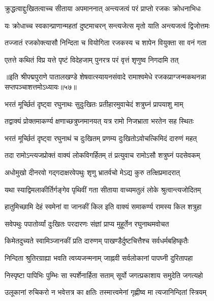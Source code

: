 \twolineshloka
{क्रुद्धत्वाद्दुःखितत्वाच्च सीताया अपमाननात्}
{अन्त्यजत्वं परं प्राप्तो रजकः क्रोधनाभिधः}%

\twolineshloka
{यः क्रोधाच्च स्वकान्प्राणान्महतां दुष्टमाचरन्}
{सन्त्यजेत्स मृतो याति अन्त्यजत्वं द्विजोत्तमः}%

\twolineshloka
{तज्जातं रजकोक्त्यासौ निन्दिता च वियोगिता}
{रजकस्य च शापेन वियुक्ता सा वनं गता}%

\twolineshloka
{एतत्ते कथितं विप्र यत्ते पृष्टं विदेहजाम्}
{पुनरत्र परं वृत्तं शृणुष्व निगदामि तत्}%


{॥इति श्रीपद्मपुराणे पातालखण्डे शेषवात्स्यायनसंवादे रामाश्वमेधे रजकप्राग्जन्मकथनन्ना सप्तपञ्चाशत्तमोऽध्यायः॥५७॥}



\twolineshloka
{भरतं मूर्च्छितं दृष्ट्वा रघुनाथः सुदुःखितः}
{प्रतीहारमुवाचेदं शत्रुघ्नं प्रापयाशु माम्}%

\twolineshloka
{तद्वाक्यं प्रोक्तमाकर्ण्य क्षणाच्छत्रुघ्नमानयत्}
{यत्र रामो निजभ्राता भरतेन सह स्थितः}%

\twolineshloka
{भरतं मूर्च्छितं दृष्ट्वा रघुनाथं च दुःखितम्}
{प्रणम्य दुःखितोऽवोचत्किमिदं दारुणं महत्}%

\twolineshloka
{तदा रामोऽन्त्यजप्रोक्तं वाक्यं लोकविगर्हितम्}
{तं प्रत्युवाच रामोऽसौ शत्रुघ्नं पदसेवकम्}%

\twolineshloka
{अधोमुखो दीनरवो गद्गदाक्षरवेपथुः}
{शृणु भ्रातर्वचो मेऽद्य कुरु तत्क्षिप्रमादरात्}%

\twolineshloka
{यथा स्याद्विमलाकीर्तिर्गङ्गेव पृथिवीं गता}
{सीताया वाच्यमतुलं लोके श्रुत्वान्त्यजोदितम्}%

\twolineshloka
{हातुमिच्छामि देहं स्वमेनां वा जानकीं किल}
{इति वाक्यं समाकर्ण्य रामस्य किल शत्रुहा}%

\twolineshloka
{सवेपथुः पपातोर्व्यां दुःखितः परदारणः}
{संज्ञां प्राप्य मुहूर्तेन रघुनाथमवोचत}%


\twolineshloka
{किमेतदुच्यते स्वामिञ्जानकीं प्रति दारुणम्}
{पाखण्डैर्दुष्टचित्तैश्च सर्वधर्मबहिष्कृतैः}%

\twolineshloka
{निन्दिता श्रुतिरग्राह्या भवति त्वग्र्यजन्मनाम्}
{जाह्नवी सर्वलोकानां पापघ्नी दुरितापहा}%

\twolineshloka
{निस्पृष्टा पापिभिः पुम्भिः सा स्पर्शेनार्हिता सताम्}
{सूर्यो जगत्प्रकाशाय समुदेति जगत्यहो}%

\twolineshloka
{उलूकानां रुचिकरो न भवेत्तत्र का क्षतिः}
{तस्मात्त्वमेनां गृह्णीष्व मा त्यजानिन्दितां स्त्रियम्}%

